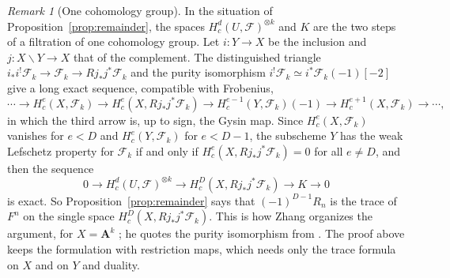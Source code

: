 \documentclass[11pt,a4paper]{article}
\theoremstyle{plain}
\theoremstyle{remark}
\newtheorem{remark}[theorem]{Remark}
\newcommand{\A}{\mathbf A}
\newcommand{\F}{\mathcal F}
\begin{document}
\begin{remark}[One cohomology group]\label{rem:onegroup}
In the situation of Proposition~\ref{prop:remainder}, the spaces $H^d_c(U,\F)^{\otimes k}$ and $K$ are the two steps
of a filtration of one cohomology group. Let $i:Y\to X$ be the inclusion and $j:X\smallsetminus Y\to X$ that of the
complement. The distinguished triangle $i_*i^!\F_k\to\F_k\to Rj_*j^*\F_k$ and the purity isomorphism
$i^!\F_k\simeq i^*\F_k(-1)[-2]$ give a long exact sequence, compatible with Frobenius,
\[
\cdots\to H^e_c(X,\F_k)\to H^e_c(X,Rj_*j^*\F_k)\to H^{e-1}_c(Y,\F_k)(-1)\to H^{e+1}_c(X,\F_k)\to\cdots,
\]
in which the third arrow is, up to sign, the Gysin map. Since $H^e_c(X,\F_k)$ vanishes for $e<D$ and
$H^e_c(Y,\F_k)$ for $e<D-1$, the subscheme $Y$ has the weak Lefschetz property for $\F_k$ if and only if
$H^e_c(X,Rj_*j^*\F_k)=0$ for all $e\ne D$, and then the sequence
\[
0\to H^d_c(U,\F)^{\otimes k}\to H^D_c(X,Rj_*j^*\F_k)\to K\to0
\]
is exact. So Proposition~\ref{prop:remainder} says that $(-1)^{D-1}R_n$ is the trace of $F^n$ on the single space
$H^D_c(X,Rj_*j^*\F_k)$. This is how Zhang organizes the argument, for $X=\A^k$ \cite[the sequence $(\dagger)$,
Lemma 2.2 and Definition 2.3]{Zhang}; he quotes the purity isomorphism from \cite[XVI, 3.7, 3.8 and 3.10]{SGA4}. The
proof above keeps the formulation with restriction maps, which needs only the trace formula on $X$ and on $Y$ and
duality.
\end{remark}
\end{document}
